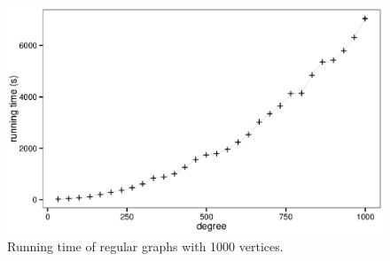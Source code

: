 \documentclass{article}
\begin{document}
\begin{figure}[!htb]
\label{fig:regular}
{\centering \includegraphics[width=1\textwidth]{regular} 
\caption{Running time of regular graphs with 1000 vertices.}
}
\end{figure}







\end{document}

